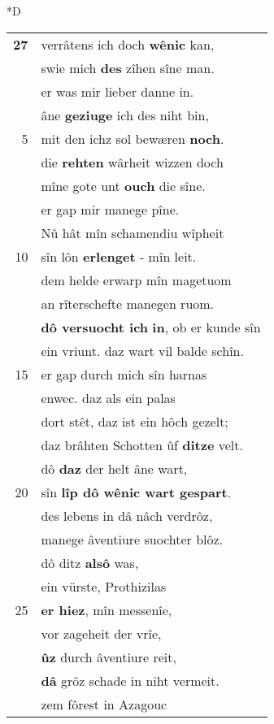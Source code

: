 \documentclass[8pt,a4paper,notitlepage]{article}
\begin{document}
\begin{table}[ht]
\begin{minipage}[t]{0.5\linewidth}
\small
\begin{center}*D
\end{center}
\begin{tabular}{rl}
\textbf{27} & verrâtens ich doch \textbf{wênic} kan,\\ 
 & swie mich \textbf{des} zîhen sîne man.\\ 
 & er was mir lieber danne in.\\ 
 & âne \textbf{geziuge} ich des niht bin,\\ 
5 & mit den ichz sol bewæren \textbf{noch}.\\ 
 & die \textbf{rehten} wârheit wizzen doch\\ 
 & mîne gote unt \textbf{ouch} die sîne.\\ 
 & er gap mir manege pîne.\\ 
 & Nû hât mîn schamendiu wîpheit\\ 
10 & sîn lôn \textbf{erlenget} - mîn leit.\\ 
 & dem helde erwarp mîn magetuom\\ 
 & an rîterschefte manegen ruom.\\ 
 & \textbf{dô versuocht ich} \textbf{in}, ob er kunde sîn\\ 
 & ein vriunt. daz wart vil balde schîn.\\ 
15 & er gap durch mich sîn harnas\\ 
 & enwec. daz als ein palas\\ 
 & dort stêt, daz ist ein hôch gezelt;\\ 
 & daz brâhten Schotten ûf \textbf{ditze} velt.\\ 
 & dô \textbf{daz} der helt âne wart,\\ 
20 & sîn \textbf{lîp dô wênic wart gespart}.\\ 
 & des lebens in dâ nâch verdrôz,\\ 
 & manege âventiure suochter blôz.\\ 
 & dô ditz \textbf{alsô} was,\\ 
 & ein vürste, Prothizilas\\ 
25 & \textbf{er hiez}, mîn messenîe,\\ 
 & vor zageheit der vrîe,\\ 
 & \textbf{ûz} durch âventiure reit,\\ 
 & \textbf{dâ} grôz schade in niht vermeit.\\ 
 & zem fôrest in Azagouc\\ 

\end{tabular}
\end{minipage}
\end{table}
\end{document}
